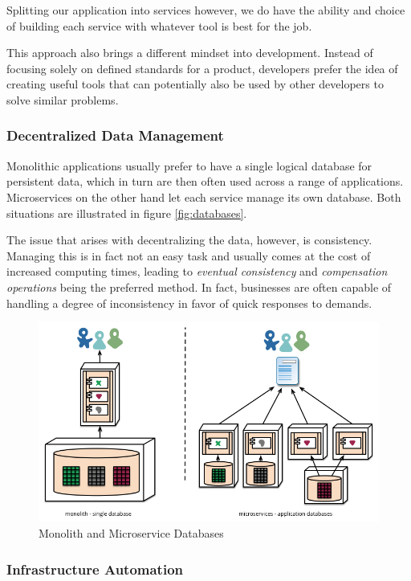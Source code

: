 Splitting our application into services however, we do have the
ability and choice of building each service with whatever tool is best
for the job.

This approach also brings a different mindset into development.
Instead of focusing solely on defined standards for a product,
developers prefer the idea of creating useful tools that can
potentially also be used by other developers to solve similar
problems.

\subsubsection{Decentralized Data Management} 
\label{sec:decentralized}

Monolithic applications usually prefer to have a single logical
database for persistent data, which in turn are then often used across
a range of applications. Microservices on the other hand let each
service manage its own database. Both situations are illustrated in 
figure \vref{fig:databases}.

The issue that arises with decentralizing the data, however, is
consistency.  Managing this is in fact not an easy task and usually
comes at the cost of increased computing times, leading to
\textit{eventual consistency} and \textit{compensation operations}
being the preferred method.  In fact, businesses are often capable of
handling a degree of inconsistency in favor of quick responses to
demands.

\begin{figure}
	\centering
	\includegraphics[width=\linewidth]{images/decentralised-data.png}
	\caption{Monolith and Microservice Databases}
	\label{fig:databases}
\end{figure}

\subsubsection{Infrastructure Automation}
\label{sec:infrastructure-automation}

